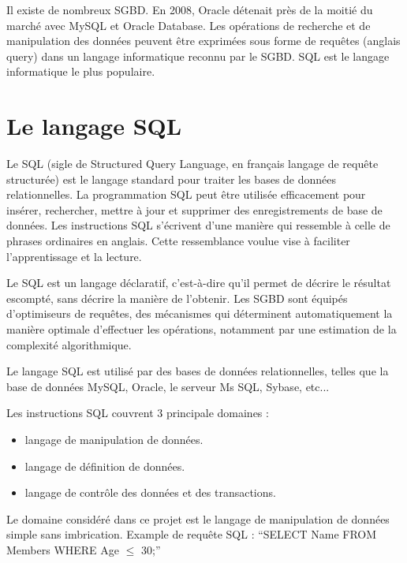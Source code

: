 \documentclass[oneside,13pt,a4paper]{report}
\begin{document}
Il existe de nombreux SGBD. En 2008, Oracle détenait près de la moitié du marché avec MySQL et Oracle Database.
Les opérations de recherche et de manipulation des données peuvent être exprimées sous forme de requêtes (anglais query)
dans un langage informatique reconnu par le SGBD. SQL est le langage informatique le plus populaire.

\section{Le langage SQL}
\label{sql}

Le SQL (sigle de Structured Query Language, en français langage de requête structurée) est le langage standard pour traiter les bases de données relationnelles.
La programmation SQL peut être utilisée efficacement pour insérer, rechercher, mettre à jour et supprimer des enregistrements de base de données.
Les instructions SQL s'écrivent d'une manière qui ressemble à celle de phrases ordinaires en anglais. Cette ressemblance voulue vise à faciliter l'apprentissage et la lecture.

Le SQL est un langage déclaratif, c'est-à-dire qu'il permet de décrire le résultat escompté, sans décrire la manière de l'obtenir.
Les SGBD sont équipés d'optimiseurs de requêtes, des mécanismes qui déterminent automatiquement la manière optimale d'effectuer les opérations,
notamment par une estimation de la complexité algorithmique.

Le langage SQL est utilisé par des bases de données relationnelles, telles que la base de données MySQL, Oracle, le serveur Ms SQL, Sybase, etc...

Les instructions SQL couvrent 3 principale domaines :
\begin{itemize}
	\item langage de manipulation de données.
	\item langage de définition de données.
	\item langage de contrôle des données et des transactions.
\end{itemize}
\vspace{0.3cm}

Le domaine considéré dans ce projet est le langage de manipulation de données simple sans imbrication.
Example de requête SQL : \enquote{SELECT Name FROM Members WHERE Age $ \leq $ 30;}

\end{document}
